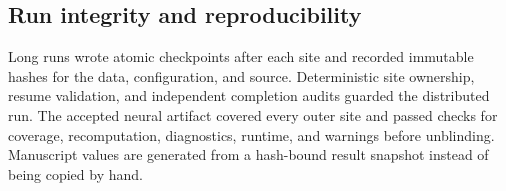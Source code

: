 \subsection{Run integrity and reproducibility}

Long runs wrote atomic checkpoints after each site and recorded immutable
hashes for the data, configuration, and source. Deterministic site ownership,
resume validation, and independent completion audits guarded the distributed
run. The accepted neural artifact covered every outer site and passed checks
for coverage, recomputation, diagnostics, runtime, and warnings before
unblinding. Manuscript values are generated from a hash-bound result snapshot
instead of being copied by hand.
